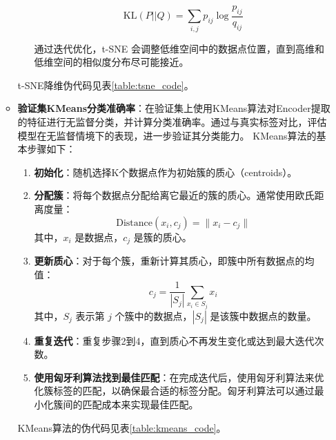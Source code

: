 \documentclass[master]{thesis-uestc}
\begin{document}
\begin{itemize}
\begin{itemize}
\begin{enumerate}
            \begin{equation}
            \text{KL}(P || Q) = \sum_{i,j} p_{ij} \log \frac{p_{ij}}{q_{ij}}
            \end{equation}
            
            通过迭代优化，t-SNE 会调整低维空间中的数据点位置，直到高维和低维空间的相似度分布尽可能接近。
        \end{enumerate}
        t-SNE降维伪代码见表\ref{table:tsne_code}。


          
          \item \textbf{验证集KMeans分类准确率}：在验证集上使用KMeans算法对Encoder提取的特征进行无监督分类，并计算分类准确率。通过与真实标签对比，评估模型在无监督情境下的表现，进一步验证其分类能力。
            KMeans算法的基本步骤如下：

            \begin{enumerate}
                \item \textbf{初始化}：随机选择K个数据点作为初始簇的质心（centroids）。
                \item \textbf{分配簇}：将每个数据点分配给离它最近的簇的质心。通常使用欧氏距离度量：
                \[
                \text{Distance}(x_i, c_j) = \| x_i - c_j \|
                \]
                其中，\(x_i\) 是数据点，\(c_j\) 是簇的质心。
                \item \textbf{更新质心}：对于每个簇，重新计算其质心，即簇中所有数据点的均值：
                \[
                c_j = \frac{1}{|S_j|} \sum_{x_i \in S_j} x_i
                \]
                其中，\(S_j\) 表示第 \(j\) 个簇中的数据点，\(|S_j|\) 是该簇中数据点的数量。
                \item \textbf{重复迭代}：重复步骤2到4，直到质心不再发生变化或达到最大迭代次数。
                \item \textbf{使用匈牙利算法找到最佳匹配}：在完成迭代后，使用匈牙利算法来优化簇标签的匹配，以确保最合适的标签分配。匈牙利算法可以通过最小化簇间的匹配成本来实现最佳匹配。
            \end{enumerate}
            KMeans算法的伪代码见表\ref{table:kmeans_code}。
      \end{itemize}      
\end{itemize}
\end{document}
